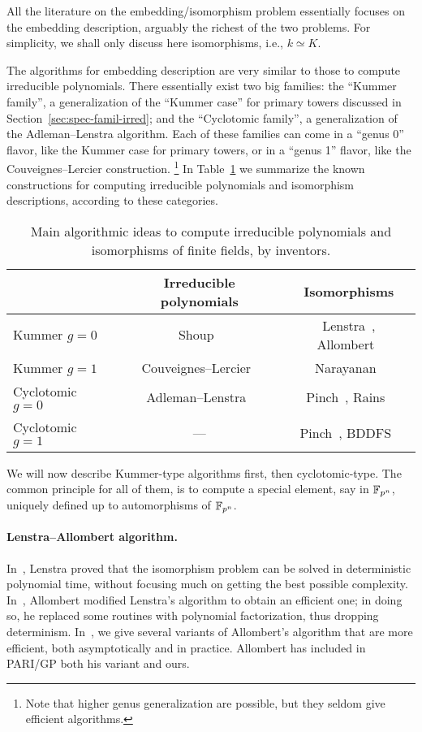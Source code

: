 \documentclass{report}
\theoremstyle{plain}
\theoremstyle{definition}
\begin{document}
All the literature on the embedding/isomorphism problem essentially
focuses on the embedding description, arguably the richest of the two
problems. %
For simplicity, we shall only discuss here isomorphisms, i.e.,
$k≃K$. %

The algorithms for embedding description are very similar to those to
compute irreducible polynomials. %
There essentially exist two big families: the ``Kummer family'', a
generalization of the ``Kummer case'' for primary towers discussed in
Section~\ref{sec:spec-famil-irred}; and the ``Cyclotomic family'', a
generalization of the Adleman--Lenstra algorithm. %
Each of these families can come in a ``genus 0'' flavor, like the
Kummer case for primary towers, or in a ``genus 1'' flavor, like the
Couveignes--Lercier construction.%
\footnote{Note that higher genus generalization are possible, but they
  seldom give efficient algorithms.}  In Table~\ref{tab:ffalgos} we
summarize the known constructions for computing irreducible
polynomials and isomorphism descriptions, according to these
categories. %


\begin{table}
  \centering
  \begin{tabular}{l | c | c}
    & Irreducible polynomials
    & Isomorphisms\\
    \hline
    Kummer $g=0$
    & Shoup~\cite{Shoup_1990,shoup93,shoup94}
    & Lenstra~\cite{LenstraJr91},
      Allombert~\cite{Allombert02}\\
    Kummer $g=1$
    & Couveignes--Lercier~\cite{couveignes+lercier11}
    & Narayanan~\cite{narayanan2016fast}\\
    Cyclotomic $g=0$
    & Adleman--Lenstra~\cite{Adleman-Lenstra}
    & Pinch~\cite{Pinch}, Rains~\cite{rains2008}\\
    Cyclotomic $g=1$
    & ---
    & Pinch~\cite{Pinch}, BDDFS~\cite{brieulle2018computing}
  \end{tabular}
  \caption{Main algorithmic ideas to compute irreducible polynomials
    and isomorphisms of finite fields, by inventors.}
  \label{tab:ffalgos}
\end{table}

We will now describe Kummer-type algorithms first, then
cyclotomic-type. %
The common principle for all of them, is to compute a special element,
say in $\mathbb{F}_{p^n}$, uniquely defined up to automorphisms of
$\mathbb{F}_{p^n}$. %

\paragraph{Lenstra--Allombert algorithm.}
In~\cite{LenstraJr91}, Lenstra proved that the isomorphism problem can
be solved in deterministic polynomial time, without focusing much on
getting the best possible complexity. %
In~\cite{Allombert02}, Allombert modified Lenstra's algorithm to
obtain an efficient one; in doing so, he replaced some routines with
polynomial factorization, thus dropping determinism. %
In~\cite{brieulle2018computing}, we give several variants of
Allombert's algorithm that are more efficient, both asymptotically and
in practice. %
Allombert has included in PARI/GP both his variant and ours. %
\end{document}
